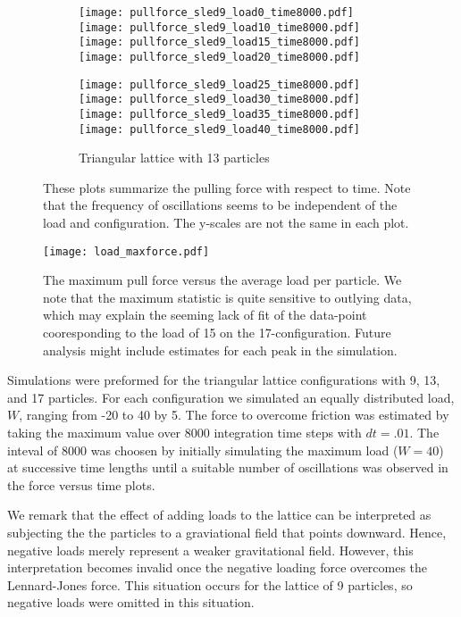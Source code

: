 \documentclass[12pt]{amsart}
\begin{document}
\begin{figure}[h]
\begin{subfigure}{\textwidth}
\begin{center}
\texttt{[image: pullforce\_sled9\_load0\_time8000.pdf]}
\texttt{[image: pullforce\_sled9\_load10\_time8000.pdf]}
\texttt{[image: pullforce\_sled9\_load15\_time8000.pdf]}
\texttt{[image: pullforce\_sled9\_load20\_time8000.pdf]}

\texttt{[image: pullforce\_sled9\_load25\_time8000.pdf]}
\texttt{[image: pullforce\_sled9\_load30\_time8000.pdf]}
\texttt{[image: pullforce\_sled9\_load35\_time8000.pdf]}
\texttt{[image: pullforce\_sled9\_load40\_time8000.pdf]}
\caption{ Triangular lattice with 13 particles } 
\end{center}
\end{subfigure}

\caption{ These plots summarize the pulling force with respect to time. Note that the frequency of oscillations seems to be independent of the load and configuration.  The y-scales are not the same in each plot.  }
\label{allplots}
\end{figure}

\begin{figure}[H]
\texttt{[image: load\_maxforce.pdf]}
\caption{The maximum pull force versus the average load per particle. 
We note that the maximum statistic is quite sensitive to outlying data, which
may explain the seeming lack of fit of the data-point cooresponding to the load
of 15 on the 17-configuration. Future analysis might include estimates for each
peak in the simulation.  
}
\label{forceload}
\end{figure}

Simulations were preformed for the triangular lattice configurations with 9,
13, and 17 particles.  For each configuration we simulated an equally
distributed load, $W$, ranging from -20 to 40 by 5.  The force to overcome
friction was estimated by taking the maximum value over 8000 integration time
steps with $dt=.01$.  The inteval of $8000$ was choosen by initially simulating
the maximum load ($W=40$) at successive time lengths until a suitable number of
oscillations was observed in the force versus time plots.  

We remark that the effect of adding loads to the lattice can be interpreted as
subjecting the the particles to a graviational field that points downward.
Hence, negative loads merely represent a weaker gravitational field.  However,
this interpretation becomes invalid once the negative loading force
overcomes the Lennard-Jones force.  This situation occurs for the lattice of 9
particles, so negative loads were omitted in this situation.
\end{document}
